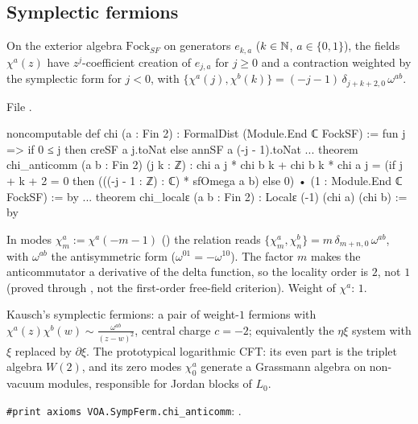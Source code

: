 \subsection{Symplectic fermions}\label{l17:sec:sf}

\begin{definition}\label{l17:def:chi}
On the exterior algebra $\mathrm{Fock}_{SF}$ on generators $e_{k,a}$ ($k\in{\mathbb{N}}$, $a\in\{0,1\}$), the
fields $\chi^a(z)$ have $z^j$-coefficient creation of $e_{j,a}$ for $j\ge0$ and a contraction weighted by
the symplectic form for $j<0$, with
$\{\chi^a(j),\chi^b(k)\}=(-j-1)\,\delta_{j+k+2,0}\,\omega^{ab}$.
\end{definition}
\noindent File .
\begin{leancode}
noncomputable def chi (a : Fin 2) : FormalDist (Module.End ℂ FockSF) :=
  fun j => if 0 ≤ j then creSF a j.toNat else annSF a (-j - 1).toNat
...
theorem chi_anticomm (a b : Fin 2) (j k : ℤ) :
    chi a j * chi b k + chi b k * chi a j
      = (if j + k + 2 = 0 then (((-j - 1 : ℤ) : ℂ) * sfOmega a b) else 0)
        • (1 : Module.End ℂ FockSF) := by
...
theorem chi_localε (a b : Fin 2) : Localε (-1) (chi a) (chi b) := by
\end{leancode}
\begin{dictionary}
In modes $\chi^a_m:=\chi^a(-m-1)$ () the relation reads $\{\chi^a_m,\chi^b_n\}=m\,\delta_{m+n,0}\,\omega^{ab}$,
with $\omega^{ab}$ the antisymmetric form  ($\omega^{01}=-\omega^{10}$). The factor $m$
makes the anticommutator a derivative of the delta function, so the locality order is $2$, not $1$
(proved through , not the first-order free-field criterion). Weight of $\chi^a$: $1$.
\end{dictionary}
\begin{physics}
Kausch's symplectic fermions: a pair of weight-$1$ fermions with $\chi^a(z)\chi^b(w)\sim\frac{\omega^{ab}}{(z-w)^2}$,
central charge $c=-2$; equivalently the $\eta\xi$ system with $\xi$ replaced by $\partial\xi$. The
prototypical logarithmic CFT: its even part is the triplet algebra $W(2)$, and its zero modes
$\chi^a_0$ generate a Grassmann algebra on non-vacuum modules, responsible for Jordan blocks of $L_0$.
\end{physics}
\begin{status}
\texttt{\#print axioms VOA.SympFerm.chi\_anticomm}: .
\end{status}

